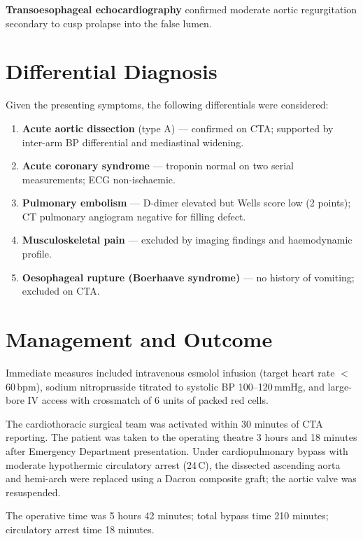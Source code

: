 \documentclass[11pt,a4paper]{article}
\begin{document}
\textbf{Transoesophageal echocardiography} confirmed moderate aortic regurgitation secondary
to cusp prolapse into the false lumen.

\section{Differential Diagnosis}

Given the presenting symptoms, the following differentials were considered:

\begin{enumerate}
  \item \textbf{Acute aortic dissection} (type A) — confirmed on CTA; supported by
        inter-arm BP differential and mediastinal widening.
  \item \textbf{Acute coronary syndrome} — troponin normal on two serial measurements;
        ECG non-ischaemic.
  \item \textbf{Pulmonary embolism} — D-dimer elevated but Wells score low (2 points);
        CT pulmonary angiogram negative for filling defect.
  \item \textbf{Musculoskeletal pain} — excluded by imaging findings and haemodynamic
        profile.
  \item \textbf{Oesophageal rupture (Boerhaave syndrome)} — no history of vomiting;
        excluded on CTA.
\end{enumerate}

\section{Management and Outcome}

Immediate measures included intravenous esmolol infusion (target heart rate $<$60\,bpm),
sodium nitroprusside titrated to systolic BP 100--120\,mmHg, and large-bore IV access with
crossmatch of 6 units of packed red cells.

The cardiothoracic surgical team was activated within 30 minutes of CTA reporting. The patient
was taken to the operating theatre 3 hours and 18 minutes after Emergency Department
presentation. Under cardiopulmonary bypass with moderate hypothermic circulatory arrest
(24\,\textdegree C), the dissected ascending aorta and hemi-arch were replaced using a
Dacron composite graft; the aortic valve was resuspended.

The operative time was 5 hours 42 minutes; total bypass time 210 minutes; circulatory arrest
time 18 minutes.
\end{document}
